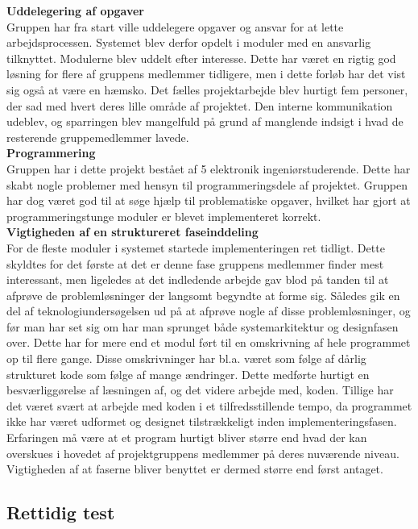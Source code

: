 \textbf{Uddelegering af opgaver}\\
Gruppen har fra start ville uddelegere opgaver og ansvar for at lette arbejdsprocessen. Systemet blev derfor opdelt i moduler med en ansvarlig tilknyttet. Modulerne blev uddelt efter interesse. Dette har været en rigtig god løsning for flere af gruppens medlemmer tidligere, men i dette forløb har det vist sig også at være en hæmsko. Det fælles projektarbejde blev hurtigt fem personer, der sad med hvert deres lille område af projektet. Den interne kommunikation udeblev, og sparringen blev mangelfuld på grund af manglende indsigt i hvad de resterende gruppemedlemmer lavede.\\

\textbf{Programmering}\\
Gruppen har i dette projekt bestået af 5 elektronik ingeniørstuderende. Dette har skabt nogle problemer med hensyn til programmeringsdele af projektet. Gruppen har dog været god til at søge hjælp til problematiske opgaver, hvilket har gjort at programmeringstunge moduler er blevet implementeret korrekt.\\

\textbf{Vigtigheden af en struktureret faseinddeling}\\
For de fleste moduler i systemet startede implementeringen ret tidligt. Dette skyldtes for det første at det er denne fase gruppens medlemmer finder mest interessant, men ligeledes at det indledende arbejde gav blod på tanden til at afprøve de problemløsninger der langsomt begyndte at forme sig. Således gik en del af teknologiundersøgelsen ud på at afprøve nogle af disse problemløsninger, og før man har set sig om har man sprunget både systemarkitektur og designfasen over. Dette har for mere end et modul ført til en omskrivning af hele programmet op til flere gange. Disse omskrivninger har bl.a. været som følge af dårlig strukturet kode som følge af mange ændringer. Dette medførte hurtigt en besværliggørelse af læsningen af, og det videre arbejde med, koden. Tillige har det været svært at arbejde med koden i et tilfredsstillende tempo, da programmet ikke har været udformet og designet tilstrækkeligt inden implementeringsfasen. Erfaringen må være at et program hurtigt bliver større end hvad der kan overskues i hovedet af projektgruppens medlemmer på deres nuværende niveau. Vigtigheden af at faserne bliver benyttet er dermed større end først antaget.\\

\subsection{Rettidig test}
